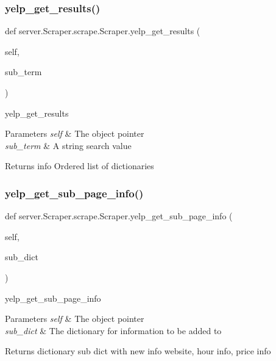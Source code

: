\subsubsection{\texorpdfstring{yelp\+\_\+get\+\_\+results()}{yelp\_get\_results()}}
{\footnotesize\ttfamily def server.\+Scraper.\+scrape.\+Scraper.\+yelp\+\_\+get\+\_\+results (\begin{DoxyParamCaption}\item[{}]{self,  }\item[{}]{sub\+\_\+term }\end{DoxyParamCaption})}





yelp\+\_\+get\+\_\+results 
\begin{DoxyParams}{Parameters}
{\em self} & The object pointer \\
\hline
{\em sub\+\_\+term} & A string search value \\
\hline
\end{DoxyParams}
\begin{DoxyReturn}{Returns}
info Ordered list of dictionaries 
\end{DoxyReturn}
\mbox{\label{classserver_1_1_scraper_1_1scrape_1_1_scraper_abbca4337e44d3989ac1cfd74cc77f65d}} 
\subsubsection{\texorpdfstring{yelp\+\_\+get\+\_\+sub\+\_\+page\+\_\+info()}{yelp\_get\_sub\_page\_info()}}
{\footnotesize\ttfamily def server.\+Scraper.\+scrape.\+Scraper.\+yelp\+\_\+get\+\_\+sub\+\_\+page\+\_\+info (\begin{DoxyParamCaption}\item[{}]{self,  }\item[{}]{sub\+\_\+dict }\end{DoxyParamCaption})}





yelp\+\_\+get\+\_\+sub\+\_\+page\+\_\+info 
\begin{DoxyParams}{Parameters}
{\em self} & The object pointer \\
\hline
{\em sub\+\_\+dict} & The dictionary for information to be added to \\
\hline
\end{DoxyParams}
\begin{DoxyReturn}{Returns}
dictionary sub dict with new info website, hour info, price info 
\end{DoxyReturn}


